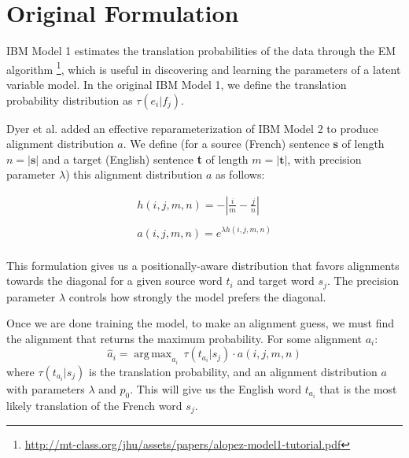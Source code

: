 \documentclass[twoside,twocolumn]{article}
\DeclareMathOperator*{\argmax}{arg\,max}
\begin{document}




\section{Original Formulation}

IBM Model 1 estimates the translation probabilities of the data through the EM
algorithm
\footnote{\url{http://mt-class.org/jhu/assets/papers/alopez-model1-tutorial.pdf}},
which is useful in discovering and learning the parameters of a
latent variable model.
In the original IBM Model 1, we define the translation probability distribution
as $\tau(e_i|f_j)$.

Dyer et al. \cite{dyer2013simple} added an effective reparameterization
of IBM Model 2 to produce alignment distribution $a$. We define (for a source
(French) sentence \textbf{s} of length $n = |\textbf{s}|$ and a target (English)
sentence \textbf{t} of length $m = |\textbf{t}|$, with precision parameter
$\lambda$) this alignment distribution $a$ as follows:

\begin{equation}
\begin{split}
h(i,j,m,n) = - \left| \frac{i}{m} - \frac{j}{n}\right| \\
\\
a(i,j,m,n) =e^{  \lambda h(i,j,m,n)} \\
\end{split}
\end{equation}

This formulation gives us a positionally-aware distribution that favors alignments
towards the diagonal for a given source word $t_i$ and target word $s_j$. The
precision parameter $\lambda$ controls how strongly the model prefers the
diagonal.

Once we are done training the model, to make an alignment guess, we must find
the alignment that returns the maximum probability. For some alignment $a_i$:
\begin{equation}
\hat{a}_i = \argmax_{a_i} \, \tau(t_{a_i}|s_j) \cdot a(i, j, m, n)
\end{equation}
where $\tau(t_{a_i}|s_j)$ is the translation probability, and an alignment
distribution $a$ with parameters $\lambda$ and $p_0$. This will give us the
English word $t_{a_i}$ that is the most likely translation of the French word
$s_j$.
\end{document}
